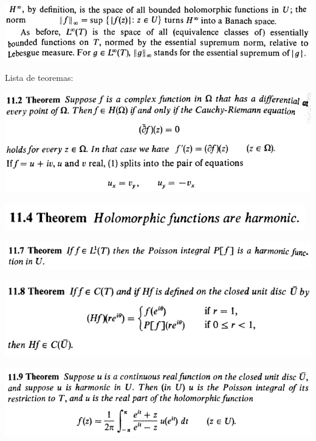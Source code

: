 \documentclass[12pt]{article}
\begin{document}
		\begin{center}
		\includegraphics[scale=0.9]{d11ponto31}
		\end{center}

Lista de teoremas:

		\begin{center}
		\includegraphics{11ponto2}
		\end{center}

		\begin{center}
		\includegraphics{11ponto4}
		\end{center}

		\begin{center}
		\includegraphics{11ponto7}
		\end{center}

		\begin{center}
		\includegraphics{11ponto8}
		\end{center}

		\begin{center}
		\includegraphics{11ponto9}
		\end{center}
\end{document}

